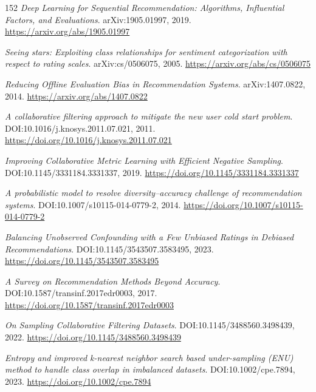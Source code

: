 \documentclass[11pt,a4paper]{article}
\begin{document}
\begin{thebibliography}{152}
\newblock \emph{Deep Learning for Sequential Recommendation: Algorithms, Influential Factors, and Evaluations}.
\newblock arXiv:1905.01997, 2019.
\newblock \url{https://arxiv.org/abs/1905.01997}

\newblock \emph{Seeing stars: Exploiting class relationships for sentiment categorization with respect to rating scales}.
\newblock arXiv:cs/0506075, 2005.
\newblock \url{https://arxiv.org/abs/cs/0506075}

\newblock \emph{Reducing Offline Evaluation Bias in Recommendation Systems}.
\newblock arXiv:1407.0822, 2014.
\newblock \url{https://arxiv.org/abs/1407.0822}

\newblock \emph{A collaborative filtering approach to mitigate the new user cold start problem}.
\newblock DOI:10.1016/j.knosys.2011.07.021, 2011.
\newblock \url{https://doi.org/10.1016/j.knosys.2011.07.021}

\newblock \emph{Improving Collaborative Metric Learning with Efficient Negative Sampling}.
\newblock DOI:10.1145/3331184.3331337, 2019.
\newblock \url{https://doi.org/10.1145/3331184.3331337}

\newblock \emph{A probabilistic model to resolve diversity--accuracy challenge of recommendation systems}.
\newblock DOI:10.1007/s10115-014-0779-2, 2014.
\newblock \url{https://doi.org/10.1007/s10115-014-0779-2}

\newblock \emph{Balancing Unobserved Confounding with a Few Unbiased Ratings in Debiased Recommendations}.
\newblock DOI:10.1145/3543507.3583495, 2023.
\newblock \url{https://doi.org/10.1145/3543507.3583495}

\newblock \emph{A Survey on Recommendation Methods Beyond Accuracy}.
\newblock DOI:10.1587/transinf.2017edr0003, 2017.
\newblock \url{https://doi.org/10.1587/transinf.2017edr0003}

\newblock \emph{On Sampling Collaborative Filtering Datasets}.
\newblock DOI:10.1145/3488560.3498439, 2022.
\newblock \url{https://doi.org/10.1145/3488560.3498439}

\newblock \emph{Entropy and improved k-nearest neighbor search based under-sampling (ENU) method to handle class overlap in imbalanced datasets}.
\newblock DOI:10.1002/cpe.7894, 2023.
\newblock \url{https://doi.org/10.1002/cpe.7894}


\end{thebibliography}
\end{document}
